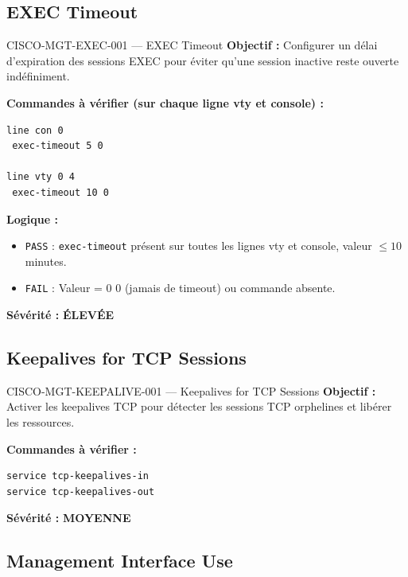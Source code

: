 \documentclass[12pt, a4paper]{report}
\begin{document}
\subsection{EXEC Timeout}

\begin{rulebox}{CISCO-MGT-EXEC-001 — EXEC Timeout}
  \textbf{Objectif :} Configurer un délai d'expiration des sessions EXEC pour éviter qu'une session inactive reste ouverte indéfiniment.

  \textbf{Commandes à vérifier (sur chaque ligne vty et console) :}
  \begin{lstlisting}
line con 0
 exec-timeout 5 0

line vty 0 4
 exec-timeout 10 0
  \end{lstlisting}

  \textbf{Logique :}
  \begin{itemize}
    \item \texttt{PASS} : \texttt{exec-timeout} présent sur toutes les lignes vty et console, valeur $\leq 10$ minutes.
    \item \texttt{FAIL} : Valeur = 0 0 (jamais de timeout) ou commande absente.
  \end{itemize}

  \textbf{Sévérité :} \textcolor{accentOrange}{\textbf{ÉLEVÉE}}
\end{rulebox}

\subsection{Keepalives for TCP Sessions}

\begin{rulebox}{CISCO-MGT-KEEPALIVE-001 — Keepalives for TCP Sessions}
  \textbf{Objectif :} Activer les keepalives TCP pour détecter les sessions TCP orphelines et libérer les ressources.

  \textbf{Commandes à vérifier :}
  \begin{lstlisting}
service tcp-keepalives-in
service tcp-keepalives-out
  \end{lstlisting}

  \textbf{Sévérité :} \textcolor{accentGreen}{\textbf{MOYENNE}}
\end{rulebox}

\subsection{Management Interface Use}
\end{document}
